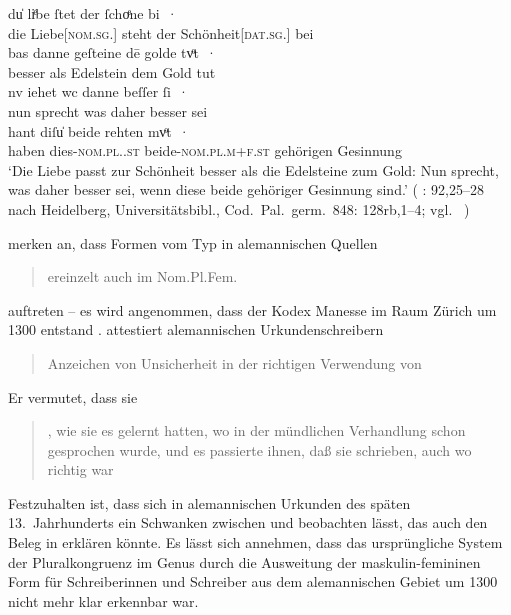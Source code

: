 \begin{exe}
\ex\label{ex:walther92_25-28_C_2}
	\gll du̍ liͤbe ſtet der ſchoͤne bi~· \\
			die Liebe[\textsc{nom.sg.\FemI}] steht der
			Schönheit[\textsc{dat.sg.\FemI}] bei \\
\sn \gll bas danne geſteine dē golde tvͦt~· \\
		besser als Edelstein dem Gold tut \\
\sn \gll nv iehet wc danne beſſer ſi~· \\
		nun sprecht was daher besser sei \\
\sn \gll hant diſu̍ beide rehten mvͦt~· \\
		haben dies-\textsc{nom.pl.\NeutI.st} beide-\textsc{nom.pl.m+f\subI.st}
			gehörigen Gesinnung \\
	\trans `Die Liebe passt zur Schönheit besser als die Edelsteine zum
		Gold: Nun sprecht, was daher besser sei, wenn diese beide gehöriger
		Gesinnung sind.'
		(%
			: 92,25--28 nach
			Heidelberg, Universitätsbibl., Cod.~Pal.~germ.~848: 128rb,1--4;
			vgl.~\cite[356--358]{bein2013}%
		)
	\\
\end{exe}

\citeauthor{ksw2} merken an, dass Formen vom Typ  in
alemannischen Quellen
\blockcquote[485]{ksw2}{ereinzelt auch im Nom.Pl.Fem.} auftreten --
es wird angenommen, dass der Kodex Manesse im Raum Zürich um 1300 entstand
\autocite[4957]{hsc}.  attestiert
alemannischen Urkundenschreibern
\blockcquote[27]{deboor1976b}{Anzeichen von Unsicherheit in der richtigen
Verwendung von }. Er vermutet, dass sie
\blockcquote[28]{deboor1976b}{ , wie sie es
gelernt hatten, wo in der mündlichen Verhandlung schon  gesprochen
wurde, und es passierte ihnen, daß sie  schrieben, auch wo
 richtig war}. Festzuhalten ist, dass sich in
alemannischen Urkunden des späten 13.~Jahrhunderts
ein Schwanken zwischen  und  beobachten lässt, das auch
den Beleg in  erklären könnte. Es lässt sich
annehmen, dass das ursprüngliche System der Pluralkongruenz im Genus durch die
Ausweitung der maskulin-femininen Form für Schreiberinnen und Schreiber aus dem
alemannischen Gebiet um 1300 nicht mehr klar
erkennbar war.

